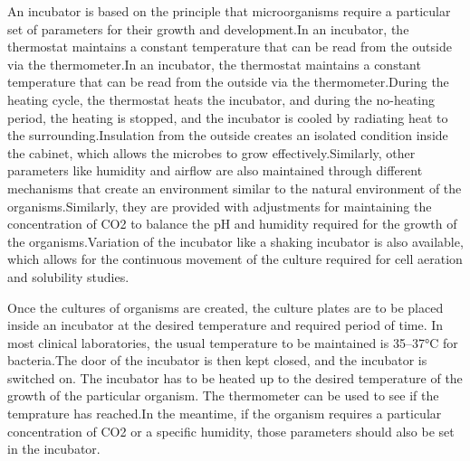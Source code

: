 \documentclass[12pt]{article}
\begin{document}
An incubator is based on the principle that microorganisms require a particular set of parameters for their growth and development.In an incubator, the thermostat maintains a constant temperature that can be read from the outside via the thermometer.In an incubator, the thermostat maintains a constant temperature that can be read from the outside via the thermometer.During the heating cycle, the thermostat heats the incubator, and during the no-heating period, the heating is stopped, and the incubator is cooled by radiating heat to the surrounding.Insulation from the outside creates an isolated condition inside the cabinet, which allows the microbes to grow effectively.Similarly, other parameters like humidity and airflow are also maintained through different mechanisms that create an environment similar to the natural environment of the organisms.Similarly, they are provided with adjustments for maintaining the concentration of CO2 to balance the pH and humidity required for the growth of the organisms.Variation of the incubator like a shaking incubator is also available, which allows for the continuous movement of the culture required for cell aeration and solubility studies.

\indent

Once the cultures of organisms are created, the culture plates are to be placed inside an incubator at the desired temperature and required period of time. In most clinical laboratories, the usual temperature to be maintained is 35–37°C for bacteria.The door of the incubator is then kept closed, and the incubator is switched on. The incubator has to be heated up to the desired temperature of the growth of the particular organism. The thermometer can be used to see if the temprature has reached.In the meantime, if the organism requires a particular concentration of CO2 or a specific humidity, those parameters should also be set in the incubator.

\indent
\end{document}

